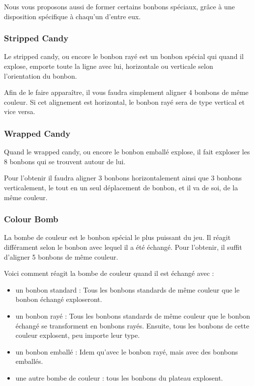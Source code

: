 \documentclass[11pt,a4paper]{article}
\begin{document}
Nous vous proposons aussi de former certains bonbons spéciaux, grâce à une disposition spécifique à chaqu'un d'entre eux.

\subsubsection{Stripped Candy}
Le stripped candy, ou encore le bonbon rayé est un bonbon spécial qui quand il 
explose, emporte toute la ligne avec lui, horizontale ou verticale selon l'orientation du bonbon.

Afin de le faire apparaître, il vous faudra simplement aligner 4 bonbons de même couleur.
Si cet alignement est horizontal, le bonbon rayé sera de type vertical et vice versa.

\subsubsection{Wrapped Candy}
Quand le wrapped candy, ou encore le bonbon emballé explose, il 
fait exploser les 8 bonbons qui se trouvent autour de lui.

Pour l'obtenir il faudra aligner 3 bonbons horizontalement ainsi que 3 bonbons 
verticalement, le tout en un seul déplacement de bonbon, et il va de soi, de la même couleur.

\subsubsection{Colour Bomb}
La bombe de couleur est le bonbon spécial le plus puissant du jeu. Il réagit différament 
selon le bonbon avec lequel il a été échangé. Pour l'obtenir, il suffit d'aligner 5 bonbons de même couleur.

Voici comment réagit la bombe de couleur quand il est échangé avec :

\begin{itemize}
	\item un bonbon standard : Tous les bonbons standards de même couleur que le bonbon échangé exploseront.
	\item un bonbon rayé : Tous les bonbons standards de même couleur que le bonbon échangé se transforment en bonbons rayés. Ensuite, tous les bonbons de cette couleur explosent, peu importe leur type.
	\item un bonbon emballé : Idem qu'avec le bonbon rayé, mais avec des bonbons emballés.
	\item une autre bombe de couleur : tous les bonbons du plateau explosent.
\end{itemize}
\end{document}
